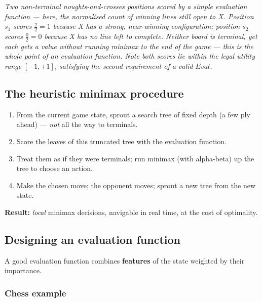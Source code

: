 \documentclass[11pt, a4paper]{article}
\begin{document}
\begin{center}

\footnotesize\textit{Two \emph{non-terminal} noughts-and-crosses positions scored by a simple evaluation function --- here, the normalised count of winning lines still open to X. Position $s_1$ scores $\tfrac{2}{2}=1$ because X has a strong, near-winning configuration; position $s_2$ scores $\tfrac{0}{2}=0$ because X has no line left to complete. Neither board is terminal, yet each gets a value without running minimax to the end of the game --- this is the whole point of an evaluation function. Note both scores lie within the legal utility range $[-1,+1]$, satisfying the second requirement of a valid $\mathit{Eval}$.}
\end{center}

\subsection{The heuristic minimax procedure}

\begin{defbox}
\begin{enumerate}
  \item From the current game state, sprout a search tree of fixed depth (a few ply ahead) — \emph{not} all the way to terminals.
  \item Score the leaves of this truncated tree with the evaluation function.
  \item Treat them as if they were terminals; run minimax (with alpha-beta) up the tree to choose an action.
  \item Make the chosen move; the opponent moves; sprout a new tree from the new state.
\end{enumerate}
\textbf{Result:} \textit{local} minimax decisions, navigable in real time, at the cost of optimality.
\end{defbox}

\subsection{Designing an evaluation function}

A good evaluation function combines \textbf{features} of the state weighted by their importance.

\subsubsection*{Chess example}
\end{document}
